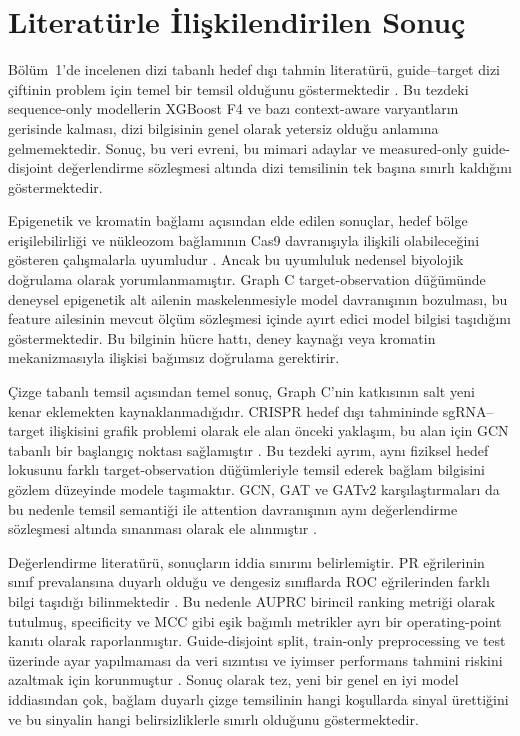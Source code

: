 \section{Literatürle İlişkilendirilen Sonuç}

Bölüm~1'de incelenen dizi tabanlı hedef dışı tahmin literatürü, guide--target dizi çiftinin problem için temel bir temsil olduğunu göstermektedir . Bu tezdeki sequence-only modellerin XGBoost F4 ve bazı context-aware varyantların gerisinde kalması, dizi bilgisinin genel olarak yetersiz olduğu anlamına gelmemektedir. Sonuç, bu veri evreni, bu mimari adaylar ve measured-only guide-disjoint değerlendirme sözleşmesi altında dizi temsilinin tek başına sınırlı kaldığını göstermektedir.

Epigenetik ve kromatin bağlamı açısından elde edilen sonuçlar, hedef bölge erişilebilirliği ve nükleozom bağlamının Cas9 davranışıyla ilişkili olabileceğini gösteren çalışmalarla uyumludur . Ancak bu uyumluluk nedensel biyolojik doğrulama olarak yorumlanmamıştır. Graph C target-observation düğümünde deneysel epigenetik alt ailenin maskelenmesiyle model davranışının bozulması, bu feature ailesinin mevcut ölçüm sözleşmesi içinde ayırt edici model bilgisi taşıdığını göstermektedir. Bu bilginin hücre hattı, deney kaynağı veya kromatin mekanizmasıyla ilişkisi bağımsız doğrulama gerektirir.

Çizge tabanlı temsil açısından temel sonuç, Graph C'nin katkısının salt yeni kenar eklemekten kaynaklanmadığıdır. CRISPR hedef dışı tahmininde sgRNA--target ilişkisini grafik problemi olarak ele alan önceki yaklaşım, bu alan için GCN tabanlı bir başlangıç noktası sağlamıştır . Bu tezdeki ayrım, aynı fiziksel hedef lokusunu farklı target-observation düğümleriyle temsil ederek bağlam bilgisini gözlem düzeyinde modele taşımaktır. GCN, GAT ve GATv2 karşılaştırmaları da bu nedenle temsil semantiği ile attention davranışının aynı değerlendirme sözleşmesi altında sınanması olarak ele alınmıştır .

Değerlendirme literatürü, sonuçların iddia sınırını belirlemiştir. PR eğrilerinin sınıf prevalansına duyarlı olduğu ve dengesiz sınıflarda ROC eğrilerinden farklı bilgi taşıdığı bilinmektedir . Bu nedenle AUPRC birincil ranking metriği olarak tutulmuş, specificity ve MCC gibi eşik bağımlı metrikler ayrı bir operating-point kanıtı olarak raporlanmıştır. Guide-disjoint split, train-only preprocessing ve test üzerinde ayar yapılmaması da veri sızıntısı ve iyimser performans tahmini riskini azaltmak için korunmuştur . Sonuç olarak tez, yeni bir genel en iyi model iddiasından çok, bağlam duyarlı çizge temsilinin hangi koşullarda sinyal ürettiğini ve bu sinyalin hangi belirsizliklerle sınırlı olduğunu göstermektedir.

